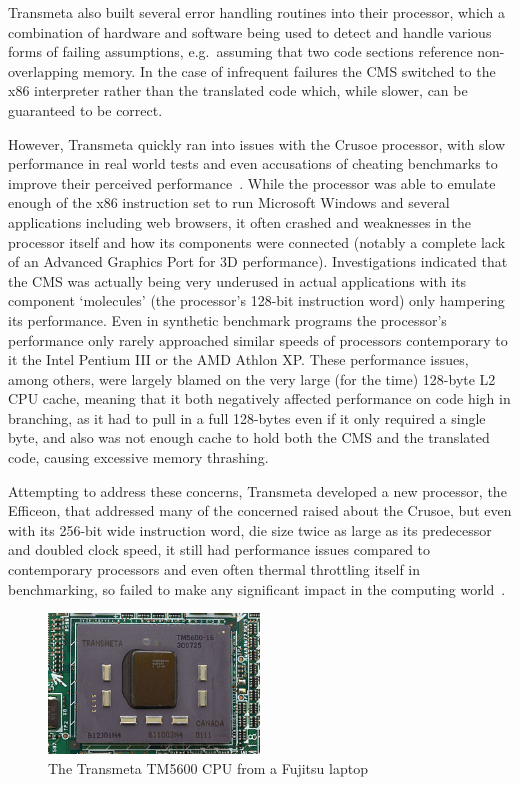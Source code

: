 Transmeta also built several error handling routines into their processor, which
a combination of hardware and software being used to detect and handle various
forms of failing assumptions, e.g.\ assuming that two code sections reference
non-overlapping memory. In the case of infrequent failures the CMS switched to
the x86 interpreter rather than the translated code which, while slower, can be
guaranteed to be correct.

However, Transmeta quickly ran into issues with the Crusoe processor, with slow
performance in real world tests and even accusations of cheating benchmarks to
improve their perceived performance~\cite{TrackingTransmetaCrusoe}. While the
processor was able to emulate enough of the x86 instruction set to run Microsoft
Windows and several applications including web browsers, it often crashed and
weaknesses in the processor itself and how its components were connected
(notably a complete lack of an Advanced Graphics Port for 3D performance).
Investigations indicated that the CMS was actually being very underused in
actual applications with its component `molecules' (the processor's 128-bit
instruction word) only hampering its performance. Even in synthetic benchmark
programs the processor's performance only rarely approached similar speeds of
processors contemporary to it the Intel Pentium III or the AMD Athlon XP\@.
These performance issues, among others, were largely blamed on the very large
(for the time) 128-byte L2 CPU cache, meaning that it both negatively affected
performance on code high in branching, as it had to pull in a full 128-bytes
even if it only required a single byte, and also was not enough cache to hold
both the CMS and the translated code, causing excessive memory thrashing.

Attempting to address these concerns, Transmeta developed a new processor, the
Efficeon, that addressed many of the concerned raised about the Crusoe, but even
with its 256-bit wide instruction word, die size twice as large as its
predecessor and doubled clock speed, it still had performance issues compared to
contemporary processors and even often thermal throttling itself in
benchmarking, so failed to make any significant impact in the computing
world~\cite{TrackingTransmetaEfficeon}.

\begin{figure}
  \includegraphics[width=0.5\textwidth]{imgs/Transmeta_TM5600}
  \caption{The Transmeta TM5600 CPU from a Fujitsu laptop}
\end{figure}

